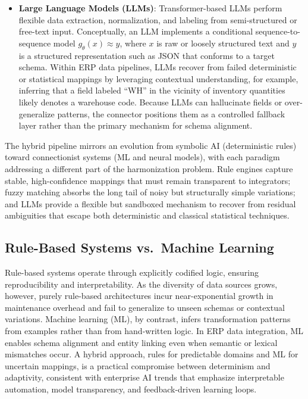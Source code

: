 \documentclass{article}
\begin{document}
\begin{itemize}
  \item \textbf{Large Language Models (LLMs)}: Transformer-based LLMs perform flexible data
  extraction, normalization, and labeling from semi-structured or free-text
  input.\autocite{brown2020language,zhao2023survey}
  Conceptually, an LLM implements a conditional sequence-to-sequence model \(g_\theta(x)
  \approx y\), where \(x\) is raw or loosely structured text and \(y\) is a structured
  representation such as JSON that conforms to a target schema.
  Within ERP data pipelines, LLMs recover from failed deterministic or statistical mappings by
  leveraging contextual understanding, for example, inferring that a field labeled ``WH'' in
  the vicinity of inventory quantities likely denotes a warehouse code.
  Because LLMs can hallucinate fields or over-generalize patterns, the connector positions them
  as a controlled fallback layer rather than the primary mechanism for schema alignment.
\end{itemize}

The hybrid pipeline mirrors an evolution from symbolic AI (deterministic rules) toward
connectionist systems (ML and neural models), with each paradigm addressing a different part
of the harmonization problem.\autocite{goodfellow2016deep,gunning2017explainable}
Rule engines capture stable, high-confidence mappings that must remain transparent to
integrators; fuzzy matching absorbs the long tail of noisy but structurally simple variations;
and LLMs provide a flexible but sandboxed mechanism to recover from residual ambiguities that
escape both deterministic and classical statistical techniques.

\subsection{Rule-Based Systems vs.\ Machine Learning}
Rule-based systems operate through explicitly codified logic, ensuring reproducibility and
interpretability.\autocite{giarratano2005expert}
As the diversity of data sources grows, however, purely rule-based architectures incur
near-exponential growth in maintenance overhead and fail to generalize to unseen schemas or
contextual variations.
Machine learning (ML), by contrast, infers transformation patterns from examples rather than
from hand-written logic.\autocite{goodfellow2016deep}
In ERP data integration, ML enables schema alignment and entity linking even when semantic or
lexical mismatches occur.
A hybrid approach, rules for predictable domains and ML for uncertain mappings, is a
practical compromise between determinism and adaptivity, consistent with enterprise AI trends
that emphasize interpretable automation, model transparency, and feedback-driven learning
loops.\autocite{gunning2017explainable}
\end{document}
